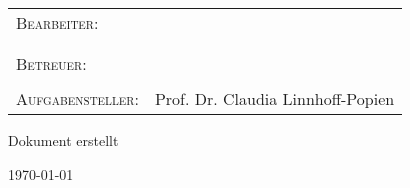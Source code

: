 \documentclass{article}
\begin{document}


\let\oldcontentsname\contentsname
\renewcommand{\contentsname}{\centering\small\oldcontentsname}

\title{\thesistitle}
\author{\authorA {} \authorB}
\date{\today}

\begin{titlepage}
	\centering
    \BgThispage
    \vspace*{-\topmargin}\vspace{-1in}%
    \vspace*{-\headheight}\vspace{-\headsep}%
    \vspace*{-\topskip}%
    \hspace*{-\oddsidemargin}
    \hspace*{-\marginparsep}
    \hspace*{-\marginparwidth}
	\vspace*{1.75cm}
	\par
	{\scshape\large \seminar\par}
	{\huge\bfseries\thesistitle\par}
	\vspace*{1.75cm}
	\large \begin{tabular}{ l l }
	  \textsc{Bearbeiter}:&{\authorA}\\
	  &{\authorB}\\
	  \\
	  \textsc{Betreuer:}&{\supervisor}\\
	  \\
	  \textsc{Aufgabensteller:}&{Prof. Dr. Claudia Linnhoff-Popien}\\
	\end{tabular}
	\par
	\vspace*{1.75cm}
	\begin{otherlanguage}{ngerman}
		{\large Dokument erstellt\par\today\par}
	\end{otherlanguage}
	\newpage
	\thispagestyle{empty}
	\mbox{}
	\newpage
\end{titlepage}
\cleardoublepage

\begin{center}
	\LARGE
	\thesistitle
\end{center} 
\vspace*{.75cm}
\begin{abstract}
\noindent\thesisabstract
\end{abstract}
\vspace*{.75cm}
\tableofcontents
\newpage
\thispagestyle{empty}
\mbox{}
\newpage
\cleardoublepage



\section*{}
\thesisauthorship

\printbibliography
\end{document}
